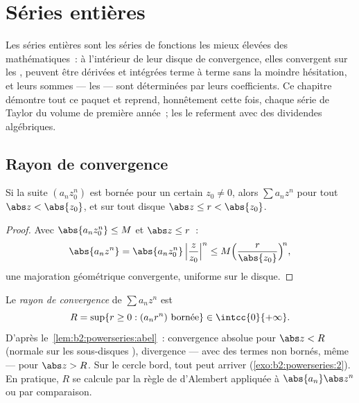 \chapter{Séries entières}\label{ch:b2:powerseries}

Les séries entières sont les séries de fonctions les mieux
élevées des mathématiques~: à l'intérieur de leur disque de
convergence, elles convergent  sur les ,
peuvent être dérivées et intégrées terme à terme sans la moindre
hésitation, et leurs sommes --- les \emph{}
--- sont déterminées par leurs coefficients. Ce chapitre démontre
tout ce paquet et reprend, honnêtement cette fois, chaque série de
Taylor du volume de première année~; les  le
referment avec des dividendes algébriques.

\section{Rayon de convergence}

\begin{lemma}[Abel]\label{lem:b2:powerseries:abel}
Si la suite $(a_n z_0^n)$ est bornée pour un certain $z_0 \neq 0$,
alors $\sum a_n z^n$   pour tout $\abs z < \abs
{z_0}$, et  sur tout disque $\abs z \leq r < \abs{z_0}$.
\end{lemma}

\begin{proof}
Avec $\abs{a_n z_0^n} \leq M$ et $\abs z \leq r$~:
\[
\abs{a_n z^n} = \abs{a_n z_0^n}\,\Bigl|\frac{z}{z_0}\Bigr|^n
\leq M\Bigl(\frac{r}{\abs{z_0}}\Bigr)^{\!n},
\]
une majoration géométrique convergente, uniforme sur le disque.
\end{proof}

\begin{definition}\label{def:b2:powerseries:radius}
Le \emph{rayon de convergence} de
$\sum a_n z^n$ est
\[
R = \sup\{r \geq 0 : (a_n r^n) \text{ bornée}\} \in
\intcc{0}{+\infty} .
\]
D'après le~\cref{lem:b2:powerseries:abel}~: convergence absolue pour
$\abs z < R$ (normale sur les sous-disques ), divergence ---
avec des termes non bornés, même --- pour $\abs z > R$. Sur le
cercle bord, tout peut arriver (\cref{exo:b2:powerseries:2}). En
pratique, $R$ se calcule par la règle de d'Alembert appliquée à
$\abs{a_n}\abs z^n$ ou par comparaison.
\end{definition}

